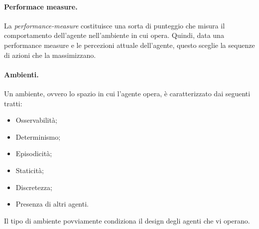 \documentclass[a4paper, 11pt]{article}
\begin{document}
\paragraph{Performace measure.} La \textit{performance-measure} costituisce una sorta di punteggio che misura il comportamento dell'agente nell'ambiente in cui opera. Quindi, data una performance measure e le percezioni attuale dell'agente, questo sceglie la sequenze di azioni che la massimizzano.

\paragraph{Ambienti.} Un ambiente, ovvero lo spazio in cui l'agente opera, è caratterizzato dai seguenti tratti: \begin{itemize}
	\item Osservabilità;
	\item Determinismo;
	\item Episodicità;
	\item Staticità;
	\item Discretezza;
	\item Presenza di altri agenti.
\end{itemize}

Il tipo di ambiente povviamente condiziona il design degli agenti che vi operano.
\end{document}
